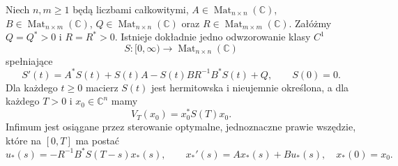 \begin{twierdzenie}
\label{thm:lin24-dre}
Niech \(n,m\ge1\) będą liczbami całkowitymi,
\(A\in\operatorname{Mat}_{n\times n}(\mathbb C)\),
\(B\in\operatorname{Mat}_{n\times m}(\mathbb C)\),
\(Q\in\operatorname{Mat}_{n\times n}(\mathbb C)\)
oraz \(R\in\operatorname{Mat}_{m\times m}(\mathbb C)\).
Załóżmy \(Q=Q^*>0\) i \(R=R^*>0\).
Istnieje dokładnie jedno
odwzorowanie klasy \(C^1\)
\[
 S\colon[0,\infty)\longrightarrow
           \operatorname{Mat}_{n\times n}(\mathbb C)
\]
spełniające
\[
 S'(t)=A^*S(t)+S(t)A
        -S(t)BR^{-1}B^*S(t)+Q,
 \qquad S(0)=0.
\]
Dla każdego \(t\ge0\)
macierz \(S(t)\) jest
hermitowska i nieujemnie
określona, a
dla każdego \(T>0\)
i \(x_0\in\mathbb C^n\) mamy
\[
 V_T(x_0)=x_0^*S(T)x_0.
\]
Infimum jest osiągane przez
sterowanie optymalne,
jednoznaczne prawie wszędzie,
które na \([0,T]\) ma postać
\[
 u_*(s)=-R^{-1}B^*S(T-s)x_*(s),
 \qquad
 x_*'(s)=Ax_*(s)+Bu_*(s),
 \quad x_*(0)=x_0.
\]
\end{twierdzenie}
